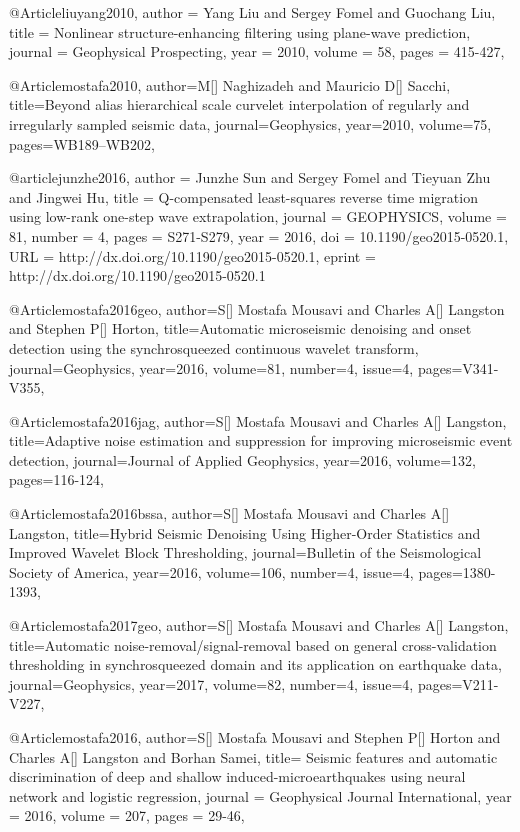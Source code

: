 @Article{liuyang2010,
  author = 	 {Yang Liu and Sergey Fomel and Guochang Liu},
  title = 	 {Nonlinear structure-enhancing filtering using plane-wave prediction},
  journal = 	 {Geophysical Prospecting},
  year = 	 2010,
  volume =	 58,
  pages =	 {415-427},
}

@Article{mostafa2010,
  author={M[] Naghizadeh and Mauricio D[] Sacchi},
  title={Beyond alias hierarchical scale curvelet interpolation of regularly and irregularly sampled seismic data},
  journal={Geophysics},
  year=2010,
  volume=75,
  pages={WB189–WB202},
}




@article{junzhe2016,
author = {Junzhe Sun and Sergey Fomel and Tieyuan Zhu and Jingwei Hu},
title = {Q-compensated least-squares reverse time migration using low-rank one-step wave extrapolation},
journal = {GEOPHYSICS},
volume = {81},
number = {4},
pages = {S271-S279},
year = {2016},
doi = {10.1190/geo2015-0520.1},
URL = {http://dx.doi.org/10.1190/geo2015-0520.1},
eprint = {http://dx.doi.org/10.1190/geo2015-0520.1}
}

@Article{mostafa2016geo,
  author={S[] Mostafa Mousavi and Charles A[] Langston and Stephen P[] Horton},
  title={Automatic microseismic denoising and onset detection using the synchrosqueezed continuous wavelet transform},
  journal={Geophysics},
  year=2016,
  volume=81,
  number=4,
  issue=4,
  pages={V341-V355},
}

@Article{mostafa2016jag,
  author={S[] Mostafa Mousavi and Charles A[] Langston},
  title={Adaptive noise estimation and suppression for improving microseismic event detection},
  journal={Journal of Applied Geophysics},
  year=2016,
  volume=132,
  pages={116-124},
}

@Article{mostafa2016bssa,
  author={S[] Mostafa Mousavi and Charles A[] Langston},
  title={Hybrid Seismic Denoising Using Higher-Order Statistics and Improved Wavelet Block Thresholding},
  journal={Bulletin of the Seismological Society of America},
  year=2016,
  volume=106,
  number=4,
  issue=4,
  pages={1380-1393},
}

@Article{mostafa2017geo,
  author={S[] Mostafa Mousavi and Charles A[] Langston},
  title={Automatic noise-removal/signal-removal based on general cross-validation thresholding in synchrosqueezed domain and its application on earthquake data},
  journal={Geophysics},
  year=2017,
  volume=82,
  number=4,
  issue=4,
  pages={V211-V227},
}

@Article{mostafa2016,
  author={S[] Mostafa Mousavi and Stephen P[] Horton and Charles A[] Langston and Borhan Samei},
  title={ Seismic features and automatic discrimination of deep and shallow induced-microearthquakes using neural network and logistic regression},
  journal = 	 {Geophysical Journal International},
  year = 	 2016,
  volume =	 207,
  pages =	 {29-46},
}


